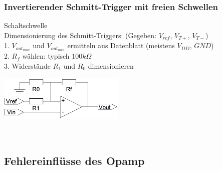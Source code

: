         \subsubsection{Invertierender Schmitt-Trigger mit freien Schwellen}
        \begin{minipage}[T]{13cm}
            Schaltschwelle
            \hspace{20.8mm}\\
            
            Dimensionierung des Schmitt-Triggers: (Gegeben: $V_{ref}$, $V_{T+}$, $V_{T-}$)\\
            1. $V_{out_{max}}$ und $V_{out_{min}}$ ermitteln aus Datenblatt (meistens $V_{DD}$, $GND$)\\
            2. $R_f$ w\"ahlen: typisch $100 k\Omega$\\
            3. Widerst\"ande $R_1$ und $R_0$ dimensionieren\\
        \end{minipage} 
        \begin{minipage}{6cm}
            \includegraphics[width=6cm]{./images/i-schmittFreieSchwellen.png} 
        \end{minipage}\\


	\subsection{Fehlereinflüsse des Opamp}
